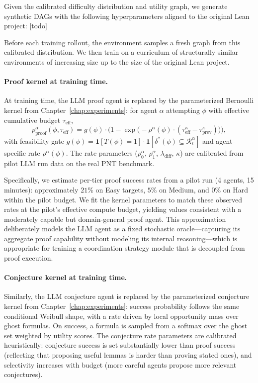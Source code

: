 Given the calibrated difficulty distribution and utility graph, we generate synthetic DAGs with the following hyperparameters aligned to the original Lean project: [todo]

Before each training rollout, the environment samples a fresh graph from this calibrated distribution. We then train on a curriculum of structurally similar environments of increasing size up to the size of the original Lean project. 

\paragraph{Proof kernel at training time.}
At training time, the LLM proof agent is replaced by the parameterized Bernoulli kernel from Chapter~\ref{chap:experiments}: for agent $\alpha$ attempting $\phi$ with effective cumulative budget $\tau_{\mathrm{eff}}$,
\[
p^\alpha_{\mathrm{proof}}(\phi, \tau_{\mathrm{eff}}) = g(\phi)\cdot\Big(1 - \exp\!\big(-\rho^\alpha(\phi)\cdot(\tau_{\mathrm{eff}}^\kappa - \tau_{\mathrm{prev}}^\kappa)\big)\Big),
\]
with feasibility gate $g(\phi) = \mathbf{1}[T(\phi)=1]\cdot\mathbf{1}[\delta^*(\phi)\subseteq\mathcal{R}^\alpha_t]$ and agent-specific rate $\rho^\alpha(\phi)$. The rate parameters ($\rho_0^\alpha$, $\rho_1^\alpha$, $\lambda_{\mathrm{diff}}$, $\kappa$) are calibrated from pilot LLM run data on the real PNT benchmark.

Specifically, we estimate per-tier proof success rates from a pilot run (4 agents, 15 minutes): approximately $21\%$ on Easy targets, $5\%$ on Medium, and $0\%$ on Hard within the pilot budget. We fit the kernel parameters to match these observed rates at the pilot's effective compute budget, yielding values consistent with a moderately capable but domain-general proof agent. This approximation deliberately models the LLM agent as a fixed stochastic oracle---capturing its aggregate proof capability without modeling its internal reasoning---which is appropriate for training a coordination strategy module that is decoupled from proof execution.
 
\paragraph{Conjecture kernel at training time.}
Similarly, the LLM conjecture agent is replaced by the parameterized conjecture kernel from Chapter~\ref{chap:experiments}: success probability follows the same conditional Weibull shape, with a rate driven by local opportunity mass over ghost formulas. On success, a formula is sampled from a softmax over the ghost set weighted by utility scores. The conjecture rate parameters are calibrated heuristically: conjecture success is set substantially lower than proof success (reflecting that proposing useful lemmas is harder than proving stated ones), and selectivity increases with budget (more careful agents propose more relevant conjectures).
 
